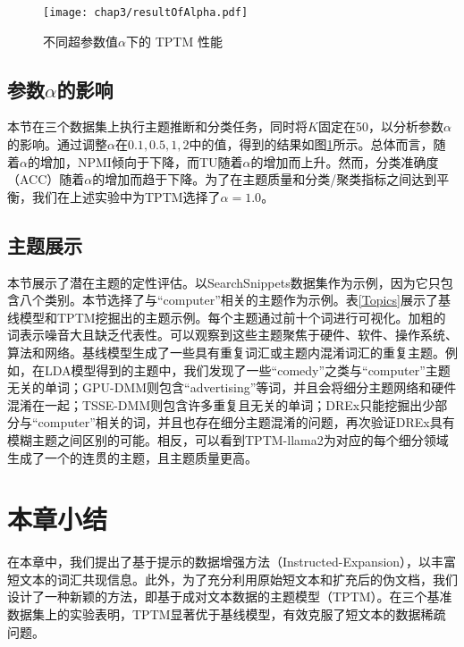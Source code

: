 \begin{figure}[ht]
    \centering
    \texttt{[image: chap3/resultOfAlpha.pdf]}
    \caption{不同超参数值$\alpha$下的 TPTM 性能}
    \label{influenceofAlpha}
\end{figure}

\subsection{\texorpdfstring{参数$\alpha$的影响}{参数alpha的影响}}
本节在三个数据集上执行主题推断和分类任务，同时将$K$固定在50，以分析参数$\alpha$的影响。通过调整$\alpha$在${0.1, 0.5, 1, 2}$中的值，得到的结果如图\ref{influenceofAlpha}所示。总体而言，随着$\alpha$的增加，NPMI倾向于下降，而TU随着$\alpha$的增加而上升。然而，分类准确度（ACC）随着$\alpha$的增加而趋于下降。为了在主题质量和分类/聚类指标之间达到平衡，我们在上述实验中为TPTM选择了$\alpha=1.0$。

\subsection{主题展示}
本节展示了潜在主题的定性评估。以SearchSnippets数据集作为示例，因为它只包含八个类别。本节选择了与“computer”相关的主题作为示例。表\ref{Topics}展示了基线模型和TPTM挖掘出的主题示例。每个主题通过前十个词进行可视化。加粗的词表示噪音大且缺乏代表性。可以观察到这些主题聚焦于硬件、软件、操作系统、算法和网络。基线模型生成了一些具有重复词汇或主题内混淆词汇的重复主题。例如，在LDA模型得到的主题中，我们发现了一些“comedy”之类与“computer”主题无关的单词；GPU-DMM则包含“advertising”等词，并且会将细分主题网络和硬件混淆在一起；TSSE-DMM则包含许多重复且无关的单词；DREx只能挖掘出少部分与“computer”相关的词，并且也存在细分主题混淆的问题，再次验证DREx具有模糊主题之间区别的可能。相反，可以看到TPTM-llama2为对应的每个细分领域生成了一个的连贯的主题，且主题质量更高。

\section{本章小结}
在本章中，我们提出了基于提示的数据增强方法（Instructed-Expansion），以丰富短文本的词汇共现信息。此外，为了充分利用原始短文本和扩充后的伪文档，我们设计了一种新颖的方法，即基于成对文本数据的主题模型（TPTM）。在三个基准数据集上的实验表明，TPTM显著优于基线模型，有效克服了短文本的数据稀疏问题。

